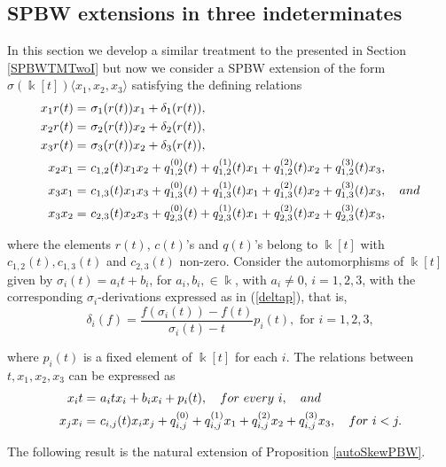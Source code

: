 \documentclass{amsart}
\theoremstyle{definition}
\theoremstyle{remark}
\numberwithin{equation}{section}
\begin{document}
\subsection{SPBW extensions in three indeterminates}\label{SPBWTMThreeI}

In this section we develop a similar treatment to the presented in Section \ref{SPBWTMTwoI} but now we consider a SPBW extension of the form $\sigma(\Bbbk[t]) \langle x_1, x_2, x_3\rangle$ satisfying the defining relations
\begin{align*}
    x_1r(t) = &\ \sigma_1(r(t)) x_1 + \delta_1(r(t)), \\
    x_2 r(t) = &\ \sigma_2(r(t)) x_2 + \delta_2(r(t)), \\
    x_3 r(t) = &\ \sigma_3(r(t)) x_2 + \delta_3(r(t)), \\
    x_2 x_1 = &\ c_{1, 2}(t)x_1 x_2 + q_{1,2}^{(0)}(t) + q_{1,2}^{(1)}(t)x_1 + q_{1,2}^{(2)}(t)x_2+ q_{1,2}^{(3)}(t)x_3, \\
    x_3 x_1 = &\ c_{1, 3}(t)x_1 x_3 + q_{1,3}^{(0)}(t) + q_{1,3}^{(1)}(t)x_1 + q_{1,3}^{(2)}(t)x_2+q_{1,3}^{(3)}(t)x_3, \quad {\rm and} \\
    x_3 x_2 = &\ c_{2, 3}(t)x_2 x_3 + q_{2,3}^{(0)}(t) + q_{2,3}^{(1)}(t)x_1 + q_{2,3}^{(2)}(t)x_2+q_{2,3}^{(3)}(t)x_3, 
\end{align*}

where the elements $r(t)$, $c(t)$'s and $q(t)$'s belong to $\Bbbk[t]$ with $c_{1,2}(t), c_{1, 3}(t)$ and $c_{2, 3}(t)$ non-zero. Consider the automorphisms of $\Bbbk[t]$ given by $\sigma_i(t) = a_it+b_i$, for $a_i, b_i, \in \Bbbk$, with $a_i\not=0$, $i=1, 2, 3$, with the corresponding $\sigma_i$-derivations expressed as in (\ref{deltap}), that is, 
\begin{equation}
\delta_i(f)=\frac{f\left(\sigma_{i}(t)\right)-f(t)}{\sigma_{i}(t)-t}p_i(t), \text{ for } i=1,2,3, 
\end{equation}

where $p_i(t)$ is a fixed element of $\Bbbk[t]$ for each $i$. The relations between $t, x_1, x_2, x_3$ can be expressed as
\begin{align}
    x_it = &\ a_itx_i+b_ix_i+p_i(t), \quad {\rm for\ every}\ i, \quad{\rm and} \label{twithxi3} \\
    x_j x_i = &\ c_{i, j}(t) x_i x_j + q_{i,j}^{(0)} + q_{i,j}^{(1)}x_1 + q_{i,j}^{(2)}x_2+q_{i,j}^{(3)}x_3, \quad {\rm for}\ i < j. \label{xiandxj3} 
\end{align}

The following result is the natural extension of Proposition \ref{autoSkewPBW}.
\end{document}
